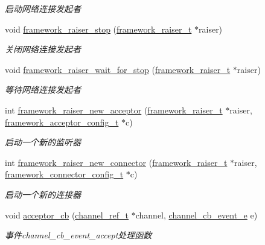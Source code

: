 \begin{DoxyCompactItemize}
\begin{DoxyCompactList}\small\item\em 启动网络连接发起者 \end{DoxyCompactList}\item 
void \hyperlink{a00058_a28061890dd7d07a16df39417ada87107_a28061890dd7d07a16df39417ada87107}{framework\+\_\+raiser\+\_\+stop} (\hyperlink{a00051_aa3ac31db191829c9e6db624d660a2563_aa3ac31db191829c9e6db624d660a2563}{framework\+\_\+raiser\+\_\+t} $\ast$raiser)
\begin{DoxyCompactList}\small\item\em 关闭网络连接发起者 \end{DoxyCompactList}\item 
void \hyperlink{a00058_a6f3a981ad344559bca4f51c73a0c678b_a6f3a981ad344559bca4f51c73a0c678b}{framework\+\_\+raiser\+\_\+wait\+\_\+for\+\_\+stop} (\hyperlink{a00051_aa3ac31db191829c9e6db624d660a2563_aa3ac31db191829c9e6db624d660a2563}{framework\+\_\+raiser\+\_\+t} $\ast$raiser)
\begin{DoxyCompactList}\small\item\em 等待网络连接发起者 \end{DoxyCompactList}\item 
int \hyperlink{a00058_ad199c6f451f0e2362371dcf6445efca6_ad199c6f451f0e2362371dcf6445efca6}{framework\+\_\+raiser\+\_\+new\+\_\+acceptor} (\hyperlink{a00051_aa3ac31db191829c9e6db624d660a2563_aa3ac31db191829c9e6db624d660a2563}{framework\+\_\+raiser\+\_\+t} $\ast$raiser, \hyperlink{a00051_a61a4e424ff4c86631423dedd97c40064_a61a4e424ff4c86631423dedd97c40064}{framework\+\_\+acceptor\+\_\+config\+\_\+t} $\ast$c)
\begin{DoxyCompactList}\small\item\em 启动一个新的监听器 \end{DoxyCompactList}\item 
int \hyperlink{a00058_ac82f5d62a951a7f7fccfa23390672c9c_ac82f5d62a951a7f7fccfa23390672c9c}{framework\+\_\+raiser\+\_\+new\+\_\+connector} (\hyperlink{a00051_aa3ac31db191829c9e6db624d660a2563_aa3ac31db191829c9e6db624d660a2563}{framework\+\_\+raiser\+\_\+t} $\ast$raiser, \hyperlink{a00051_a81253f4c995b97e69be0e67f7a26097f_a81253f4c995b97e69be0e67f7a26097f}{framework\+\_\+connector\+\_\+config\+\_\+t} $\ast$c)
\begin{DoxyCompactList}\small\item\em 启动一个新的连接器 \end{DoxyCompactList}\item 
void \hyperlink{a00058_a4ef7d97742bc9410f486ebc4e0b75e82_a4ef7d97742bc9410f486ebc4e0b75e82}{acceptor\+\_\+cb} (\hyperlink{a00051_a151271c9d188ef28d4d24bb81dcc1263_a151271c9d188ef28d4d24bb81dcc1263}{channel\+\_\+ref\+\_\+t} $\ast$channel, \hyperlink{a00051_aaf2cba5d4035f3d56350b59342ebf65c_aaf2cba5d4035f3d56350b59342ebf65c}{channel\+\_\+cb\+\_\+event\+\_\+e} e)
\begin{DoxyCompactList}\small\item\em 事件channel\+\_\+cb\+\_\+event\+\_\+accept处理函数 \end{DoxyCompactList}\end{DoxyCompactItemize}


